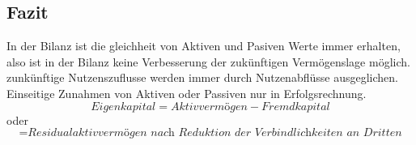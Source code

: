 \subsection{Fazit}
In der Bilanz ist die gleichheit von Aktiven und Pasiven Werte immer erhalten, also ist in der Bilanz keine Verbesserung der zukünftigen Vermögenslage möglich. zunkünftige Nutzenszuflusse werden immer durch Nutzenabflüsse ausgeglichen.
Einseitige Zunahmen von Aktiven oder Passiven nur in Erfolgsrechnung.
\[
    Eigenkapital = \textit{Aktivvermögen} - Fremdkapital
\]
oder
\[
   = \textit{Residualaktivvermögen nach Reduktion der Verbindlichkeiten an Dritten}
\]